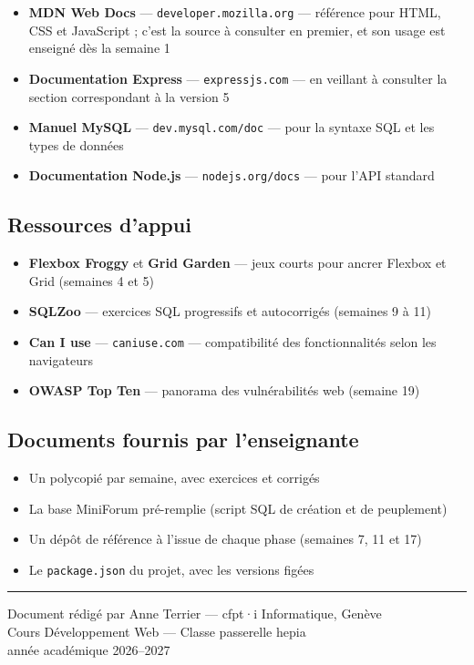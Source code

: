 \documentclass[a4paper,11pt]{article}
\begin{document}
\begin{itemize}
  \item \textbf{MDN Web Docs} --- \texttt{developer.mozilla.org} --- référence pour HTML, CSS et JavaScript ; c'est la source à consulter en premier, et son usage est enseigné dès la semaine 1
  \item \textbf{Documentation Express} --- \texttt{expressjs.com} --- en veillant à consulter la section correspondant à la version 5
  \item \textbf{Manuel MySQL} --- \texttt{dev.mysql.com/doc} --- pour la syntaxe SQL et les types de données
  \item \textbf{Documentation Node.js} --- \texttt{nodejs.org/docs} --- pour l'API standard
\end{itemize}

\subsection{Ressources d'appui}

\begin{itemize}
  \item \textbf{Flexbox Froggy} et \textbf{Grid Garden} --- jeux courts pour ancrer Flexbox et Grid (semaines 4 et 5)
  \item \textbf{SQLZoo} --- exercices SQL progressifs et autocorrigés (semaines 9 à 11)
  \item \textbf{Can I use} --- \texttt{caniuse.com} --- compatibilité des fonctionnalités selon les navigateurs
  \item \textbf{OWASP Top Ten} --- panorama des vulnérabilités web (semaine 19)
\end{itemize}

\subsection{Documents fournis par l'enseignante}

\begin{itemize}
  \item Un polycopié par semaine, avec exercices et corrigés
  \item La base MiniForum pré-remplie (script SQL de création et de peuplement)
  \item Un dépôt de référence à l'issue de chaque phase (semaines 7, 11 et 17)
  \item Le \texttt{package.json} du projet, avec les versions figées
\end{itemize}

\vspace{0.8cm}
\noindent\rule{\linewidth}{0.4pt}
\begin{center}
  \small\color{cfptDarkGrey}
  Document rédigé par Anne Terrier --- cfpt·i Informatique, Genève\\
  Cours Développement Web --- Classe passerelle hepia\\
  année académique 2026--2027
\end{center}
\end{document}
